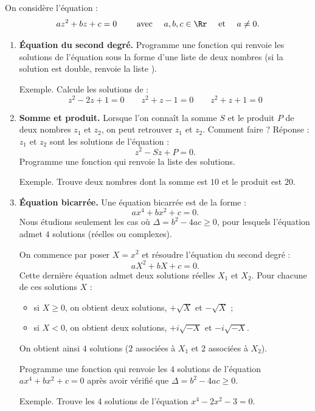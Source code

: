 \documentclass[11pt,class=report,crop=false]{standalone}
\begin{document}
\begin{activite}
	


On considère l'équation :
$$az^2+bz+c=0 \qquad \text{ avec } \quad a,b,c \in \Rr \quad \text{ et } \quad a \neq 0.$$
\begin{enumerate}
  \item \textbf{\'Equation du second degré.}
  Programme une fonction  qui renvoie les solutions de l'équation sous la forme d'une liste de deux nombres \ci{[z1,z2]} (si la solution est double, renvoie la liste \ci{[z0,z0]}).
  
  
  Exemple. Calcule les solutions de :
  $$z^2 - 2z + 1 = 0 \qquad  z^2 + z - 1 = 0 \qquad z^2 + z + 1 = 0$$
  
  \item \textbf{Somme et produit.} 
  Lorsque l'on connaît la somme $S$ et le produit $P$ de deux nombres $z_1$ et $z_2$,
  on peut retrouver $z_1$ et $z_2$. Comment faire ? Réponse : $z_1$ et $z_2$ sont les solutions de l'équation :
  $$z^2 - S z + P = 0.$$
  Programme une fonction  qui renvoie la liste \ci{[z1,z2]} des solutions.
  
  Exemple. Trouve deux nombres dont la somme est $10$ et le produit est $20$.
  
  \item \textbf{\'Equation bicarrée.}
  Une équation bicarrée est de la forme :
  $$ax^4 + bx^2 + c = 0.$$
  Nous étudions seulement les cas où $\Delta = b^2 -4ac \ge 0$, pour lesquels l'équation admet $4$ solutions (réelles ou complexes).
  
  On commence par poser $X=x^2$ et résoudre l'équation du second degré :
  $$ aX^2 + bX + c = 0.$$
  Cette dernière équation admet deux solutions réelles $X_1$ et $X_2$.
  Pour chacune de ces solutions $X$ :
    \begin{itemize}
      \item si $X \ge 0$, on obtient deux solutions, $+\sqrt{X}$ et $-\sqrt{X}$ ;
      \item si $X < 0$, on obtient deux solutions, $+i\sqrt{-X}$ et $-i\sqrt{-X}$.
    \end{itemize}
   On obtient ainsi $4$ solutions ($2$ associées à $X_1$ et $2$ associées à $X_2$).
   
   Programme une fonction  qui renvoie les $4$ solutions    
    de l'équation  $ax^4 + bx^2 + c = 0$ après avoir vérifié que $\Delta = b^2 -4ac \ge 0$.
  
  Exemple. Trouve les $4$ solutions de l'équation $x^4-2x^2-3=0$.  
\end{enumerate} 
\end{activite}
\end{document}
